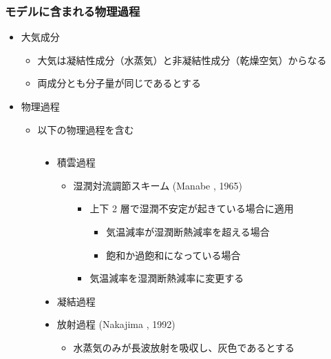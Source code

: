 \documentclass[aspectratio=149,9pt,fleqn]{beamer}
\begin{document}
\begin{frame}
	\frametitle{モデルに含まれる物理過程}
	\begin{itemize}
		\item 大気成分
			\begin{itemize}
				\item 大気は凝結性成分（水蒸気）と非凝結性成分（乾燥空気）からなる
				\item 両成分とも分子量が同じであるとする
			\end{itemize}
		\item 物理過程
			\begin{itemize}
				\item 以下の物理過程を含む
			\end{itemize}
	\end{itemize}
	\begin{columns}[onlytextwidth,T]
		\begin{column}{.05\textwidth}
		\end{column}
		\begin{column}{.45\textwidth}
			\begin{itemize}
				\item 積雲過程
					\begin{itemize}
						\item 湿潤対流調節スキーム (Manabe \etal*, 1965)
							\begin{itemize}
								\item 上下 2 層で湿潤不安定が起きている場合に適用
									\begin{itemize}
										\item 気温減率が湿潤断熱減率を超える場合
										\item 飽和か過飽和になっている場合
									\end{itemize}
								\item 気温減率を湿潤断熱減率に変更する
							\end{itemize}
					\end{itemize}
				\item 凝結過程
				\item 放射過程 (Nakajima \etal*, 1992)
					\begin{itemize}
						\item 水蒸気のみが長波放射を吸収し、灰色であるとする
					\end{itemize}
			\end{itemize}
		\end{column}
		\begin{column}{.45\textwidth}
			\begin{itemize}

\end{itemize}
\end{column}
\end{columns}
\end{frame}
\end{document}
